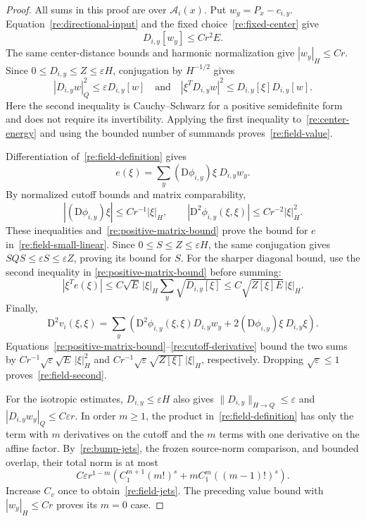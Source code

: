 \begin{proof}
All sums in this proof are over $\mathcal A_i(x)$.  Put
$w_y=P_x-c_{i,y}$.  Equation~\eqref{re:directional-input} and the
fixed choice~\eqref{re:fixed-center} give
\begin{equation}
 \label{re:center-energy}
 D_{i,y}[w_y]\le C r^2E.
\end{equation}
The same center-distance bounds and harmonic normalization give
$|w_y|_H\le Cr$.  Since $0\le D_{i,y}\le Z\le\varepsilon H$,
conjugation by $H^{-1/2}$ gives
\begin{equation}
 \label{re:positive-matrix-bound}
 |D_{i,y}w|_Q^2\le\varepsilon D_{i,y}[w]
 \quad\text{and}\quad
 |\xi^TD_{i,y}w|^2\le D_{i,y}[\xi]D_{i,y}[w].
\end{equation}
Here the second inequality is Cauchy--Schwarz for a positive
semidefinite form and does not require its invertibility.  Applying
the first inequality to~\eqref{re:center-energy} and using the bounded
number of summands proves~\eqref{re:field-value}.

Differentiation of~\eqref{re:field-definition} gives
\[
 e(\xi)=\sum_y
          (\mathrm D\phi_{i,y})\xi\ D_{i,y}w_y.
\]
By normalized cutoff bounds and matrix comparability,
\begin{equation}
 \label{re:cutoff-derivative}
 |(\mathrm D\phi_{i,y})\xi|\le Cr^{-1}|\xi|_H,
 \qquad
 |\mathrm D^2\phi_{i,y}(\xi,\xi)|\le Cr^{-2}|\xi|_H^2.
\end{equation}
These inequalities and~\eqref{re:positive-matrix-bound} prove the
bound for $e$ in~\eqref{re:field-small-linear}.  Since
$0\le S\le Z\le\varepsilon H$, the same conjugation gives
$SQS\le\varepsilon S\le\varepsilon Z$, proving its bound for $S$.
For the sharper diagonal bound, use the second inequality in
\eqref{re:positive-matrix-bound} before summing:
\[
 |\xi^Te(\xi)|
 \le C\sqrt E\,|\xi|_H\sum_y\sqrt{D_{i,y}[\xi]}
 \le C\sqrt{Z[\xi]E}\,|\xi|_H.
\]
Finally,
\[
 \mathrm D^2v_i(\xi,\xi)
 =\sum_y\left(
   \mathrm D^2\phi_{i,y}(\xi,\xi)D_{i,y}w_y
       +2(\mathrm D\phi_{i,y})\xi\ D_{i,y}\xi\right).
\]
Equations~\eqref{re:positive-matrix-bound}--\eqref{re:cutoff-derivative}
bound the two sums by
$Cr^{-1}\sqrt\varepsilon\sqrt E\,|\xi|_H^2$ and
$Cr^{-1}\sqrt\varepsilon\sqrt{Z[\xi]}\,|\xi|_H$, respectively.
Dropping $\sqrt\varepsilon\le1$ proves~\eqref{re:field-second}.

For the isotropic estimates, $D_{i,y}\le\varepsilon H$ also gives
$\|D_{i,y}\|_{H\to Q}\le\varepsilon$ and
$|D_{i,y}w_y|_Q\le C\varepsilon r$.  In order $m\ge1$, the
product in~\eqref{re:field-definition} has only the term with $m$
derivatives on the cutoff and the $m$ terms with one derivative on
the affine factor.  By~\eqref{re:bump-jets}, the frozen source-norm
comparison, and bounded overlap, their total norm is at most
\[
 C\varepsilon r^{1-m}
 \left(C_1^{m+1}(m!)^s
                  +m C_1^m((m-1)!)^s\right).
\]
Increase $C_v$ once to obtain~\eqref{re:field-jets}.  The preceding
value bound with $|w_y|_H\le Cr$ proves its $m=0$ case.
\end{proof}

